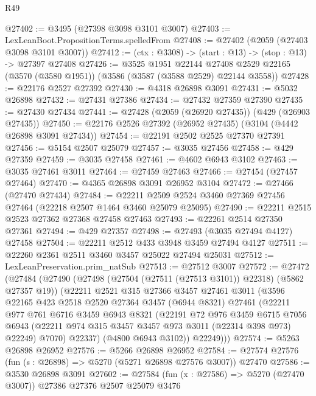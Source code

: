 \begin{lexlean}{R49}
\begin{coremodule}
@27402 := @3495 (@27398 @3098 @3101 @3007)
@27403 := LexLeanBoot.PropositionTerms.spelledFrom
@27408 := @27402 (@2059 (@27403 @3098 @3101 @3007))
@27412 := (ctx : @3308) -> (start : @13) -> (stop : @13) -> @27397 @27408
@27426 := @3525
    @1951
    @22144
    @27408
    @2529
    @22165
    (@3570 (@3580 @1951))
    (@3586 (@3587 (@3588 @2529) @22144 @3558))
@27428 := @22176 @2527 @27392
@27430 := @4318 @26898 @3091
@27431 := @5032 @26898
@27432 := @27431 @27386
@27434 := @27432 @27359 @27390
@27435 := @27430 @27434
@27441 := @27428 (@2059 (@26920 @27435)) (@429 (@26903 @27435))
@27450 := @22176 @2526 @27392 (@26952 @27435) (@3104 (@4442 @26898 @3091 @27434))
@27454 := @22191 @2502 @2525 @27370 @27391
@27456 := @5154 @2507 @25079
@27457 := @3035 @27456
@27458 := @429 @27359
@27459 := @3035 @27458
@27461 := @4602 @6943 @3102
@27463 := @3035 @27461 @3011
@27464 := @27459 @27463
@27466 := @27454 (@27457 @27464)
@27470 := @4365 @26898 @3091 @26952 @3104
@27472 := @27466 (@27470 @27434)
@27484 := @22211 @2509 @2524 @3460 @27369 @27456 @27464 (@22218 @2507 @1464 @3460 @25079 @25095)
@27490 := @22211 @2515 @2523 @27362 @27368 @27458 @27463
@27493 := @22261 @2514 @27350 @27361
@27494 := @429 @27357
@27498 := @27493 (@3035 @27494 @4127) @27458
@27504 := @22211 @2512 @433 @3948 @3459 @27494 @4127
@27511 := @22260 @2361 @2511 @3460 @3457 @25022 @27494 @25031
@27512 := LexLeanPreservation.prim_natSub
@27513 := @27512 @3007
@27572 := @27472
    (@27484
      (@27490
        (@27498 (@27504 (@27511 (@27513 @3101)) @22318) (@5862 @27357 @19))
        (@22211
          @2521
          @315
          @27366
          @3457
          @27461
          @3011
          (@3596
            @22165
            @423
            @2518
            @2520
            @27364
            @3457
            (@6944 @8321)
            @27461
            (@22211
              @977
              @761
              @6716
              @3459
              @6943
              @8321
              (@22191
                @72
                @976
                @3459
                @6715
                @7056
                @6943
                (@22211 @974 @315 @3457 @3457 @973 @3011 (@22314 @398 @973) @22249)
                @7070)
              @22337)
            (@4800 @6943 @3102))
          @22249)))
@27574 := @5263 @26898 @26952
@27576 := @5266 @26898 @26952
@27584 := @27574 @27576 (fun (s : @26898) => @5270 (@5271 @26898 @27576 @3007)) @27470
@27586 := @3530 @26898 @3091
@27602 := @27584
    (fun (x : @27586) => @5270 (@27470 @3007))
    @27386
    @27376
    @2507
    @25079
    @3476

\end{coremodule}
\end{lexlean}
